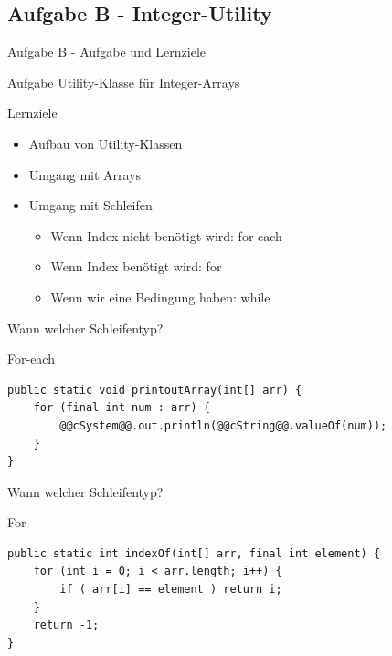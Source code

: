 \documentclass[aspectratio=169]{beamer}
\begin{document}
\subsection{Aufgabe B - Integer-Utility}

\begin{frame}{Aufgabe B - Aufgabe und Lernziele}
  \begin{block}{Aufgabe}
    \pause
    Utility-Klasse für Integer-Arrays
  \end{block}

  \pause
  \begin{block}{Lernziele}
    \begin{itemize}
      \item Aufbau von Utility-Klassen
      \pause
      \item Umgang mit Arrays
      \pause
      \item Umgang mit Schleifen \begin{itemize}
        \pause
        \item Wenn Index \color{alertcolor}nicht \color{FGround}benötigt wird: \color{keywordcolor}for-each\color{FGround}
        \pause
        \item Wenn Index benötigt wird: \color{keywordcolor}for\color{FGround}
        \pause
        \item Wenn wir eine Bedingung haben: \color{keywordcolor}while\color{FGround}
      \end{itemize}
    \end{itemize}
  \end{block}
\end{frame}

\begin{frame}[fragile]{Wann welcher Schleifentyp?}
  \begin{exampleblock}{For-each}
    \begin{lstlisting}
public static void printoutArray(int[] arr) {
    for (final int num : arr) {
        @@cSystem@@.out.println(@@cString@@.valueOf(num));
    }
}
    \end{lstlisting}
  \end{exampleblock}
\end{frame}

\begin{frame}[fragile]{Wann welcher Schleifentyp?}
  \begin{exampleblock}{For}
    \begin{lstlisting}
public static int indexOf(int[] arr, final int element) {
    for (int i = 0; i < arr.length; i++) {
        if ( arr[i] == element ) return i;
    }
    return -1;
}
    \end{lstlisting}
  \end{exampleblock}
\end{frame}
\end{document}
